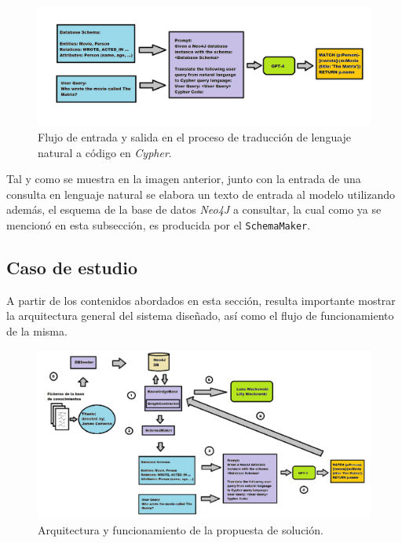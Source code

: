 \begin{figure}[H]\label{completeinoutgpt4}
	\centering
	\includegraphics[width = 1\textwidth]{./Graphics/inoutgpt4}
	\caption{Flujo de entrada y salida en el proceso de traducción de lenguaje natural a código en \textit{Cypher}.}
\end{figure}

Tal y como se muestra en la imagen anterior, junto con la entrada de una consulta en lenguaje natural se elabora un texto de entrada al modelo utilizando además, el esquema de la base de datos \textit{Neo4J} a consultar, la cual como ya se mencionó en esta subsección, es producida por el \texttt{SchemaMaker}.

\subsection{Caso de estudio} \label{sample_case}

A partir de los contenidos abordados en esta sección, resulta importante mostrar la arquitectura general del sistema diseñado, así como el flujo de funcionamiento de la misma.

\begin{figure}[H]
	\centering
	\includegraphics[width = 1.05\textwidth]{./Graphics/case_of_study}
	\caption{Arquitectura y funcionamiento de la propuesta de solución.}
\end{figure}\label{fig:caseofstudy}


